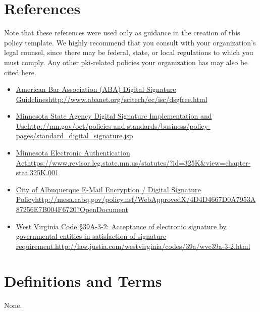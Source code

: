 \section{References}
Note that these references were used only as guidance in the creation of this policy template.  
We highly recommend that you consult with your organization's legal counsel, since there may be federal, state, or local regulations to which you must comply.  
Any other \gls{pki}-related policies your organization has may also be cited here.
\begin{itemize}
\item
\href{http://www.abanet.org/scitech/ec/isc/dsgfree.html}{American Bar Association (ABA) Digital Signature Guidelines}\newline\url{http://www.abanet.org/scitech/ec/isc/dsgfree.html}
\item
\href{http://mn.gov/oet/policies-and-standards/business/policy-pages/standard_digital_signature.jsp}{Minnesota State Agency Digital Signature Implementation and Use}\newline\url{http://mn.gov/oet/policies-and-standards/business/policy-pages/standard_digital_signature.jsp}
\item
\href{https://www.revisor.leg.state.mn.us/statutes/?id=325K&view=chapter-stat.325K.001}{Minnesota Electronic Authentication Act}\newline\url{https://www.revisor.leg.state.mn.us/statutes/?id=325K&view=chapter-stat.325K.001}
\item
\href{http://mesa.cabq.gov/policy.nsf/WebApprovedX/4D4D4667D0A7953A87256E7B004F6720?OpenDocument}{City of Albuquerque E-Mail Encryption / Digital Signature Policy}\newline\url{http://mesa.cabq.gov/policy.nsf/WebApprovedX/4D4D4667D0A7953A87256E7B004F6720?OpenDocument}
\item
\href{http://law.justia.com/westvirginia/codes/39a/wvc39a-3-2.html}{West Virginia Code \S{}39A-3-2:  Acceptance of electronic signature by governmental entities in satisfaction of signature requirement.}\newline\url{http://law.justia.com/westvirginia/codes/39a/wvc39a-3-2.html} 
\end{itemize}
\section{Definitions and Terms}
None.
\CommonRevisionHistory
